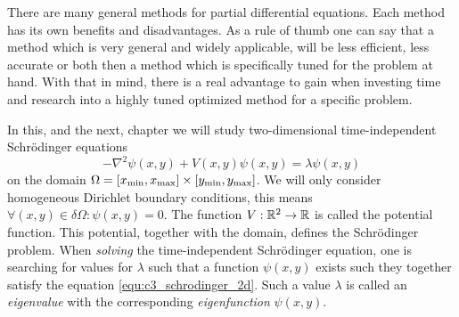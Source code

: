 



There are many general methods for partial differential equations. Each method has its own benefits and disadvantages. As a rule of thumb one can say that a method which is very general and widely applicable, will be less efficient, less accurate or both then a method which is specifically tuned for the problem at hand. With that in mind, there is a real advantage to gain when investing time and research into a highly tuned optimized method for a specific problem.

In this, and the next, chapter we will study two-dimensional time-independent Schrödinger equations
\begin{equation}\label{equ:c3_schrodinger_2d}
    -\nabla^2\psi(x, y) + V(x, y) \psi(x, y) = \lambda \psi(x, y)
\end{equation}
on the domain $\Omega = [{x_{\text{min}}}, {x_{\text{max}}}]\times[{y_{\text{min}}}, {y_{\text{max}}}]$. We will only consider homogeneous Dirichlet boundary conditions, this means $\forall (x, y) \in \delta\Omega : \psi(x, y) = 0$. The function $V: \mathbb{R}^2 \to \mathbb{R}$ is called the potential function. This potential, together with the domain, defines the Schrödinger problem. When \emph{solving} the time-independent Schrödinger equation, one is searching for values for $\lambda$ such that a function $\psi(x, y)$  exists such they together satisfy the equation \eqref{equ:c3_schrodinger_2d}. Such a value $\lambda$ is called an \emph{eigenvalue} with the corresponding \emph{eigenfunction} $\psi(x, y)$.

